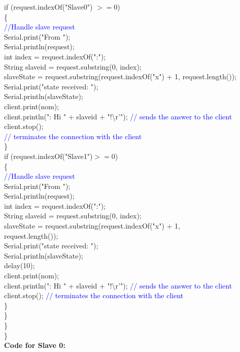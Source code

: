 \documentclass[12pt,a4paper]{article}
\begin{document}
     if (request.indexOf("Slave0") $>= 0$) \\
\{\\
       \textcolor{blue}{//Handle slave request}\\
       Serial.print("From "); \\
       Serial.println(request);\\
       int index = request.indexOf(":");\\
       String slaveid = request.substring(0, index);\\
       slaveState = request.substring(request.indexOf("x") + 1, request.length());\\
       Serial.print("state received: "); \\
       Serial.println(slaveState);\\
       client.print(nom);\\
       client.println(": Hi " + slaveid + "!\textbackslash r'"); \textcolor{blue}{// sends the answer to the client}\\
       client.stop();  \\             \textcolor{blue}{ // terminates the connection with the client}\\
   \}\\ [3pt]
     if (request.indexOf("Slave1")$ >= 0$) \\
 \{\\
      \textcolor{blue}{ //Handle slave request}\\
       Serial.print("From ");\\
       Serial.println(request);\\
       int index = request.indexOf(":");\\
       String slaveid = request.substring(0, index);\\
       slaveState = request.substring(request.indexOf("x") + 1,\\ request.length());\\
       Serial.print("state received: "); \\
       Serial.println(slaveState);\\
       delay(10);\\
       client.print(nom);\\
       client.println(": Hi " + slaveid + "!\textbackslash r'"); \textcolor{blue}{// sends the answer to the client}\\
       client.stop(); \textcolor{blue}{// terminates the connection with the client}\\
    \}\\
   \}\\
 \}\\
\}\\[15pt]
\vspace{5mm}
\setlength{\parindent}{0eM}
\hspace{1cm}\textbf{\large Code for Slave 0:}\\[6pt]
\setlength{\parindent}{5eM}
\end{document}
